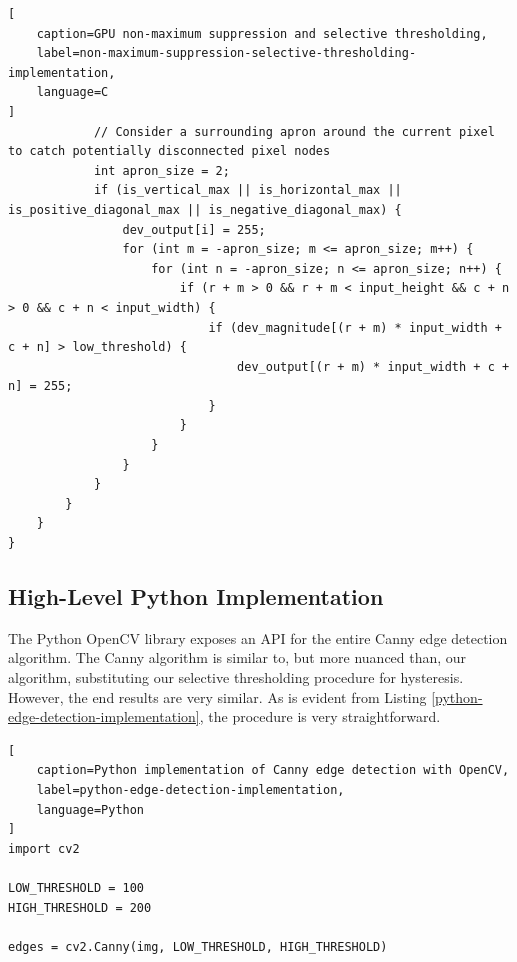 \documentclass[journal]{IEEEtran}
\begin{document}
\begin{lstlisting}[
	caption=GPU non-maximum suppression and selective thresholding,
	label=non-maximum-suppression-selective-thresholding-implementation,
	language=C
]
			// Consider a surrounding apron around the current pixel to catch potentially disconnected pixel nodes
			int apron_size = 2;
			if (is_vertical_max || is_horizontal_max || is_positive_diagonal_max || is_negative_diagonal_max) {
				dev_output[i] = 255;
				for (int m = -apron_size; m <= apron_size; m++) {
					for (int n = -apron_size; n <= apron_size; n++) {
						if (r + m > 0 && r + m < input_height && c + n > 0 && c + n < input_width) {
							if (dev_magnitude[(r + m) * input_width + c + n] > low_threshold) {
								dev_output[(r + m) * input_width + c + n] = 255;
							}
						}
					}
				}
			}
		}
    }
}
\end{lstlisting}

\subsection{High-Level Python Implementation}
The Python OpenCV library exposes an API for the entire Canny edge detection algorithm. The Canny algorithm is similar to, but more nuanced than, our algorithm, substituting our selective thresholding procedure for hysteresis. However, the end results are very similar. As is evident from Listing \ref{python-edge-detection-implementation}, the procedure is very straightforward.
\begin{lstlisting}[
	caption=Python implementation of Canny edge detection with OpenCV,
	label=python-edge-detection-implementation,
	language=Python
]
import cv2

LOW_THRESHOLD = 100
HIGH_THRESHOLD = 200

edges = cv2.Canny(img, LOW_THRESHOLD, HIGH_THRESHOLD)
\end{lstlisting}
\end{document}
